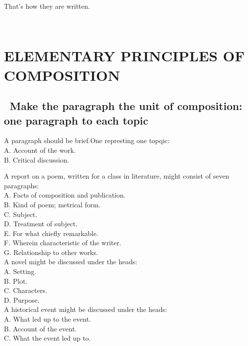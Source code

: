 \documentclass[10pt]{report}
\begin{document}
 That's how they are written.
 
 
 \pagebreak
 
 \newpage
 ~
 
 \pagebreak
 
 \chapter{ELEMENTARY PRINCIPLES OF
COMPOSITION}
 
 \section {\bfseries \ Make the paragraph the unit of composition: one paragraph to
each topic}


A paragraph should be brief.One represting one topqic:\\

\noindent
A. Account of the work.\\
B. Critical discussion.

\pagebreak

\noindent
A report on a poem, written for a class in literature, might consist of seven paragraphs:\\

\noindent
A. Facts of composition and publication.\\
B. Kind of poem; metrical form.\\
C. Subject.\\
D. Treatment of subject.\\
E. For what chiefly remarkable.\\
F. Wherein characteristic of the writer.\\
G. Relationship to other works.\\

\noindent
A novel might be discussed under the heads:\\


A. Setting.\\
B. Plot.\\
C. Characters.\\
D. Purpose.\\


A historical event might be discussed under the heads:\\


A. What led up to the event.\\
B. Account of the event.\\
C. What the event led up to.\\
\end{document}
